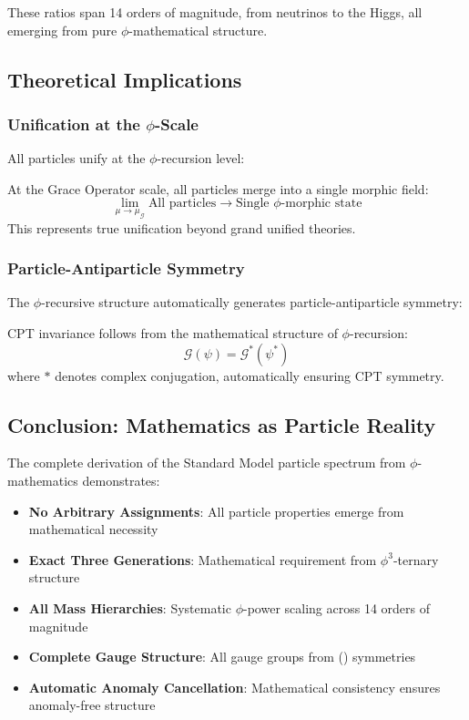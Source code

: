 These ratios span 14 orders of magnitude, from neutrinos to the Higgs, all emerging from pure $\phi$-mathematical structure.

\subsection{Theoretical Implications}

\subsubsection{Unification at the $\phi$-Scale}

All particles unify at the $\phi$-recursion level:

\begin{theorem}
At the Grace Operator scale, all particles merge into a single morphic field:
\begin{equation}
\lim_{\mu \rightarrow \mu_{\mathcal{G}}} \text{All particles} \rightarrow \text{Single } \phi\text{-morphic state}
\end{equation}
This represents true unification beyond grand unified theories.
\end{theorem}

\subsubsection{Particle-Antiparticle Symmetry}

The $\phi$-recursive structure automatically generates particle-antiparticle symmetry:

\begin{theorem}
CPT invariance follows from the mathematical structure of $\phi$-recursion:
\begin{equation}
\mathcal{G}(\psi) = \mathcal{G}^*(\psi^*)
\end{equation}
where $*$ denotes complex conjugation, automatically ensuring CPT symmetry.
\end{theorem}

\subsection{Conclusion: Mathematics as Particle Reality}

The complete derivation of the Standard Model particle spectrum from $\phi$-mathematics demonstrates:

\begin{itemize}
\item \textbf{No Arbitrary Assignments}: All particle properties emerge from mathematical necessity
\item \textbf{Exact Three Generations}: Mathematical requirement from $\phi^3$-ternary structure
\item \textbf{All Mass Hierarchies}: Systematic $\phi$-power scaling across 14 orders of magnitude
\item \textbf{Complete Gauge Structure}: All gauge groups from () symmetries
\item \textbf{Automatic Anomaly Cancellation}: Mathematical consistency ensures anomaly-free structure
\end{itemize}

